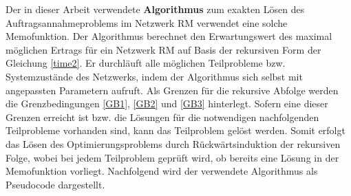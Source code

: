 Der in dieser Arbeit verwendete \textbf{Algorithmus} zum exakten Lösen des Auftragsannahmeproblems im Netzwerk RM verwendet eine solche Memofunktion. Der Algorithmus berechnet den Erwartungswert des maximal möglichen Ertrags für ein Netzwerk RM auf Basis der rekursiven Form der Gleichung \eqref{time2}. Er durchläuft alle möglichen Teilprobleme bzw. Systemzustände des Netzwerks, indem der Algorithmus sich selbst mit angepassten Parametern aufruft. Als Grenzen für die rekursive Abfolge werden die Grenzbedingungen \eqref{GB1}, \eqref{GB2} und \eqref{GB3} hinterlegt. Sofern eine dieser Grenzen erreicht ist bzw. die Lösungen für die notwendigen nachfolgenden Teilprobleme vorhanden sind, kann das Teilproblem gelöst werden. Somit erfolgt das Lösen des Optimierungsproblems durch Rückwärtsinduktion der rekursiven Folge, wobei bei jedem Teilproblem geprüft wird, ob bereits eine Lösung in der Memofunktion vorliegt. Nachfolgend wird der verwendete Algorithmus als Pseudocode dargestellt.


